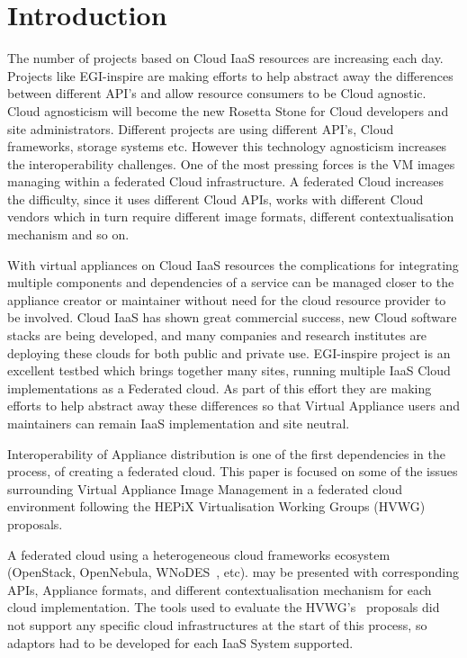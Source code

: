 \documentclass{cai}
\begin{document}
\section{Introduction}
\label{sect-introduction}
The number of projects based on Cloud IaaS resources are increasing each day. Projects like EGI-inspire are making efforts to help abstract away the differences between different API's and allow resource consumers to be Cloud agnostic.
Cloud agnosticism will become the new Rosetta Stone for Cloud developers and site administrators. Different projects are using different API's, Cloud frameworks, storage systems etc. 
However this technology agnosticism increases the interoperability challenges. One of the most pressing forces is the VM images managing within a federated Cloud infrastructure.
A federated Cloud increases the difficulty, since it uses different Cloud APIs, works with different Cloud vendors which in turn require different image formats, different contextualisation mechanism and so on. 

With virtual appliances on Cloud IaaS resources the complications for integrating multiple components and dependencies of a service can be managed closer to the appliance creator or maintainer without need for the cloud resource provider to be involved. 
Cloud IaaS has shown great commercial success, new Cloud software stacks are being developed, and many companies and research institutes are deploying these clouds for both public and private use. 
EGI-inspire project is an excellent testbed which brings together many sites, running multiple IaaS Cloud implementations as a Federated cloud. As part of this effort they are making efforts to help abstract away these differences so that Virtual Appliance users and maintainers can remain IaaS implementation and site neutral.

Interoperability of Appliance distribution is one of the first dependencies in the process, of creating a federated cloud. This paper is focused on some of the issues surrounding Virtual Appliance Image Management in a federated cloud environment following the HEPiX Virtualisation Working Groups (HVWG)~\cite{hepix} proposals.

A federated cloud using a heterogeneous cloud frameworks ecosystem (OpenStack, OpenNebula, WNoDES~\cite{wnodes}, etc). may be presented with corresponding APIs, Appliance formats, and different contextualisation mechanism for each cloud implementation. 
The tools used to evaluate the HVWG's~\cite{hepix} proposals did not support any specific cloud infrastructures at the start of this process, so adaptors had to be developed for each IaaS System supported. 
\end{document}
